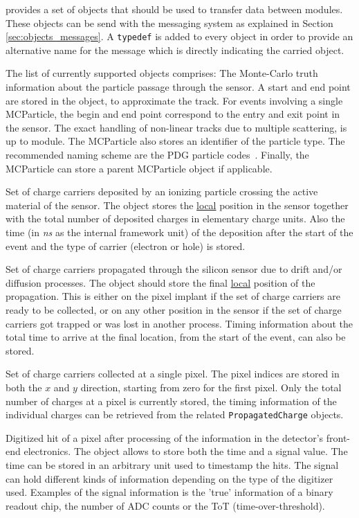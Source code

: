 \apsq provides a set of objects that should be used to transfer data between modules.
These objects can be send with the messaging system as explained in Section \ref{sec:objects_messages}.
A \texttt{typedef} is added to every object in order to provide an alternative name for the message which is directly indicating the carried object.

The list of currently supported objects comprises:
The Monte-Carlo truth information about the particle passage through the sensor.
A start and end point are stored in the object, to approximate the track.
For events involving a single MCParticle, the begin and end point correspond to the entry and exit point in the sensor.
The exact handling of non-linear tracks due to multiple scattering, is up to module.
The MCParticle also stores an identifier of the particle type.
The recommended naming scheme are the PDG particle codes~\cite{pdg}.
Finally, the MCParticle can store a parent MCParticle object if applicable.

Set of charge carriers deposited by an ionizing particle crossing the active material of the sensor.
The object stores the \underline{local} position in the sensor together with the total number of deposited charges in elementary charge units.
Also the time (in \textit{ns} as the internal framework unit) of the deposition after the start of the event and the type of carrier (electron or hole) is stored.

Set of charge carriers propagated through the silicon sensor due to drift and/or diffusion processes.
The object should store the final \underline{local} position of the propagation.
This is either on the pixel implant if the set of charge carriers are ready to be collected, or on any other position in the sensor if the set of charge carriers got trapped or was lost in another process.
Timing information about the total time to arrive at the final location, from the start of the event, can also be stored.

Set of charge carriers collected at a single pixel.
The pixel indices are stored in both the $x$ and $y$ direction, starting from zero for the first pixel.
Only the total number of charges at a pixel is currently stored, the timing information of the individual charges can be retrieved from the related \texttt{PropagatedCharge} objects.

Digitized hit of a pixel after processing of the information in the detector's front-end electronics.
The object allows to store both the time and a signal value.
The time can be stored in an arbitrary unit used to timestamp the hits.
The signal can hold different kinds of information depending on the type of the digitizer used.
Examples of the signal information is the 'true' information of a binary readout chip, the number of ADC counts or the ToT (time-over-threshold).
